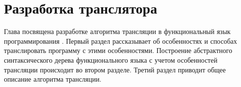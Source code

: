 \section{Разработка транслятора}
\label{translator}

Глава посвящена разработке алгоритма трансляции \miniKanren{} в функциональный язык программирования \haskell{}.
Первый раздел рассказывает об особенностях \miniKanren{} и способах транслировать программу с этими особенностями.
Построение абстрактного синтаксического дерева функционального языка с учетом особенностей трансляции \miniKanren{} происходит во втором разделе.
Третий раздел приводит общее описание алгоритма трансляции.




